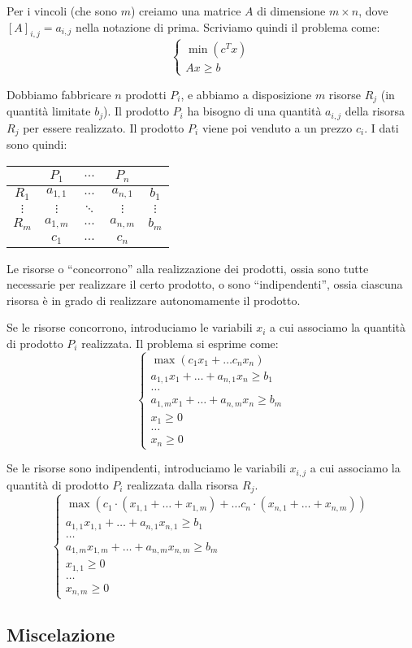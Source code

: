 Per i vincoli (che sono $m$) creiamo una matrice $A$ di dimensione $m \times n$, dove $[A]_{i,j} = a_{i,j}$ nella notazione di prima.
Scriviamo quindi il problema come:
\[
	\begin{cases}
		\min \left( c^{T} x \right) \\
		A x \ge b
	\end{cases}
\]


Dobbiamo fabbricare $n$ prodotti $P_i$, e abbiamo a disposizione $m$ risorse $R_j$ (in quantit\`a limitate $b_j$).
Il prodotto $P_i$ ha bisogno di una quantit\`a $a_{i,j}$ della risorsa $R_j$ per essere realizzato.
Il prodotto $P_i$ viene poi venduto a un prezzo $c_i$.
I dati sono quindi:
\begin{center}
	\begin{tabular}{c|ccc|c}
		& $P_1$ & $\dots$ & $P_n$ & \\
		\hline
		$R_1$ & $a_{1,1}$ & $\dots$ & $a_{n, 1}$ & $b_1$ \\
		$\vdots$ & $\vdots$ & $\ddots$ & $\vdots$ & $\vdots$ \\
		$R_m$ & $a_{1, m}$ & $\dots$ & $a_{n, m}$ & $b_m$ \\
		\hline
		& $c_1$ & $\dots$ & $c_n$ &
	\end{tabular}
\end{center}
Le risorse o ``concorrono'' alla realizzazione dei prodotti, ossia sono tutte necessarie per realizzare il certo prodotto, o sono ``indipendenti'', ossia ciascuna risorsa \`e in grado di realizzare autonomamente il prodotto.

Se le risorse concorrono, introduciamo le variabili $x_i$ a cui associamo la quantit\`a di prodotto $P_i$ realizzata.
Il problema si esprime come:
\[
	\begin{cases}
		\max \left( c_1 x_1 + \dots c_n x_n \right) \\
		a_{1,1} x_1 + \dots + a_{n,1} x_n \ge b_1 \\
		\dots \\
		a_{1,m} x_1 + \dots + a_{n,m} x_n \ge b_m \\
		x_1 \ge 0 \\
		\dots \\
		x_n \ge 0
	\end{cases}
\]

Se le risorse sono indipendenti, introduciamo le variabili $x_{i,j}$ a cui associamo la quantit\`a di prodotto $P_i$ realizzata dalla risorsa $R_j$.
\[
	\begin{cases}
		\max \left( c_1 \cdot (x_{1,1} + \dots + x_{1,m}) + \dots c_n \cdot (x_{n,1} + \dots + x_{n,m}) \right) \\
		a_{1,1} x_{1,1} + \dots + a_{n,1} x_{n,1} \ge b_1 \\
		\dots \\
		a_{1,m} x_{1,m} + \dots + a_{n,m} x_{n,m} \ge b_m \\
		x_{1,1} \ge 0 \\
		\dots \\
		x_{n,m} \ge 0
	\end{cases}
\]

\subsection{Miscelazione}

